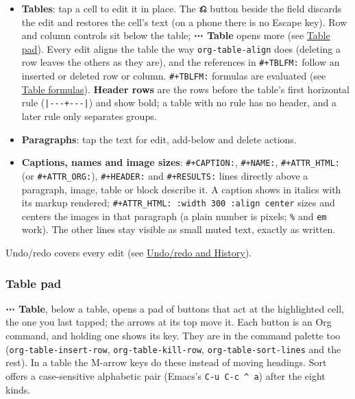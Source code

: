 \documentclass[11pt]{article}
\begin{document}
\begin{itemize}
\item \textbf{Tables}: tap a cell to edit it in place. The \textbf{⎌} button beside the field discards the edit and restores the cell's text (on a phone there is no Escape key). Row and column controls sit below the table; \textbf{⋯ Table} opens more (see \hyperref[sec:org8085b39]{Table pad}). Every edit aligns the table the way \texttt{org-table-align} does (deleting a row leaves the others as they are), and the references in \texttt{\#+TBLFM:} follow an inserted or deleted row or column. \texttt{\#+TBLFM:} formulas are evaluated (see \hyperref[sec:org7d24a5b]{Table formulas}). \textbf{Header rows} are the rows before the table's first horizontal rule (\texttt{|-{}-{}-+-{}-{}-|}) and show bold; a table with no rule has no header, and a later rule only separates groups.
\item \textbf{Paragraphs}: tap the text for edit, add-below and delete actions.
\item \textbf{Captions, names and image sizes}: \texttt{\#+CAPTION:}, \texttt{\#+NAME:}, \texttt{\#+ATTR\_HTML:} (or \texttt{\#+ATTR\_ORG:}), \texttt{\#+HEADER:} and \texttt{\#+RESULTS:} lines directly above a paragraph, image, table or block describe it. A caption shows in italics with its markup rendered; \texttt{\#+ATTR\_HTML: :width 300 :align center} sizes and centers the images in that paragraph (a plain number is pixels; \texttt{\%} and \texttt{em} work). The other lines stay visible as small muted text, exactly as written.
\end{itemize}

Undo/redo covers every edit (see \hyperref[sec:org82ca105]{Undo/redo and History}).

\subsubsection{Table pad}
\label{sec:org8085b39}
\textbf{⋯ Table}, below a table, opens a pad of buttons that act at the highlighted cell, the one you last tapped; the arrows at its top move it. Each button is an Org command, and holding one shows its key. They are in the command palette too (\texttt{org-table-insert-row}, \texttt{org-table-kill-row}, \texttt{org-table-sort-lines} and the rest). In a table the M-arrow keys do these instead of moving headings. Sort offers a case-sensitive alphabetic pair (Emacs's \texttt{C-u C-c \textasciicircum{} a}) after the eight kinds.
\end{document}
